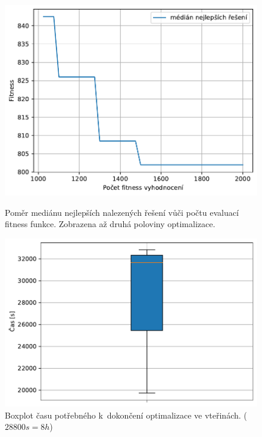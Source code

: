 \begin{figure}[H]
\begin{minipage}[t]{0.475\linewidth}
	\includegraphics[width=\textwidth]{obrazky-figures/statistics/HIFU/flower/15/DE/bestsToFitness_1.pdf}
	\caption{Poměr mediánu nejlepších nalezených řešení vůči počtu evaluací fitness funkce. Zobrazena až druhá poloviny optimalizace.}
	\label{fg:hifu:flower:de:fitPerf}
\end{minipage}
\hfill
\begin{minipage}[t]{0.475\linewidth}
\includegraphics[width=\linewidth]{obrazky-figures/statistics/HIFU/flower/15/DE/timeBoxplot_WithOutliers.pdf}
\caption{Boxplot času potřebného k~dokončení optimalizace ve vteřinách. ($28800s = 8h$)}
\label{fg:hifu:flower:de:time}
\end{minipage}
\end{figure}

